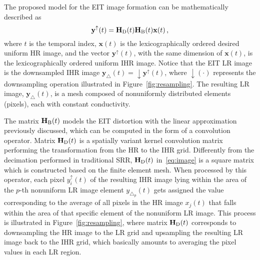 \documentclass[10pt]{IEEEtran}
\newcommand{\cred}{}
\newcommand{\cblue}{}
\newcommand{\vx}{\mathbf{x}}
\newcommand{\vy}{\mathbf{y}}
\newcommand{\mH}{\mathbf{H}}
\begin{document}
The proposed model for the EIT image formation can be mathematically described as
\begin{equation} \label{eq:image}
    \vy^{\uparrow}(t) = \mH_{\tiny{\text{D}}}(t) \mH_{\tiny{\text{B}}}(t) \vx(t)
    \,\text{,}
\end{equation}
where $t$ is the temporal index, $\vx(t)$ is the lexicographically ordered desired uniform HR image, and the vector $\vy^{\uparrow}(t)$, with the same dimension of $\vx(t)$, is the lexicographically ordered uniform IHR image. Notice that the EIT LR image is the downsampled IHR image $\vy_{\triangle}(t) = \downarrow \vy^{\uparrow}(t)$, where $\downarrow(\cdot)$ represents the downsampling operation illustrated in Figure~\ref{fig:resampling}. The resulting LR image, $\vy_{\triangle}(t)$, is a mesh composed of nonuniformly distributed elements (pixels), each with constant conductivity.



The matrix $\mH_{\tiny{\text{B}}}(t)$ models the EIT distortion with the linear approximation previously discussed, which can be computed in the form of a convolution operator.
%
Matrix $\mH_{\tiny{\text{D}}}(t)$ is a spatially variant kernel convolution matrix performing the transformation from the HR to the IHR grid. Differently from the decimation performed in traditional SRR, $\mH_{\tiny{\text{D}}}(t)$ in~\eqref{eq:image} is a square matrix which is constructed based on the finite element mesh. When processed by this operator, each pixel $y_{i}^{\uparrow}(t)$ of the resulting IHR image lying within the area of the $p$-th nonuniform LR image element $y_{\triangle_{p}}(t)$ gets assigned the value corresponding to the average of all pixels in the HR image $x_j(t)$ that falls within the area of that specific element of the nonuniform LR image.
%
%
%
This process is illustrated in Figure~\ref{fig:resampling}, where matrix $\mH_{\tiny{\text{D}}}(t)$ corresponds to downsampling the HR image to the LR grid and upsampling the resulting LR image back to the IHR grid, which basically amounts to averaging the pixel values in each LR region.
\end{document}
